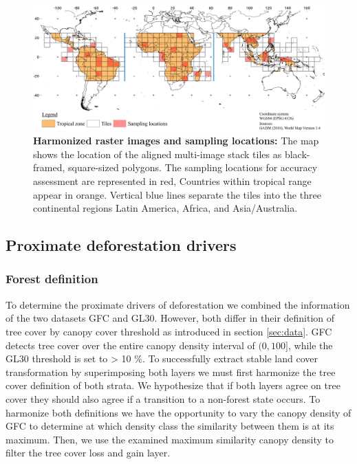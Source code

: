 		\begin{figure}[!ht]
			\centering
			\includegraphics[scale=.96]{img/method_overview_frameless}
			\caption[Harmonized raster images and sampling locations]{\textbf{Harmonized raster images and sampling locations:} The map shows the location of the aligned multi-image stack tiles as black-framed, square-sized polygons. The sampling locations for accuracy assessment are represented in red, Countries within tropical range appear in orange. Vertical blue lines separate the tiles into the three continental regions Latin America, Africa, and Asia/Australia.}
			\label{fig:aligned_tiles}
		\end{figure}

	\subsection{Proximate deforestation drivers} 
		\subsubsection{Forest definition}
		\label{subsubsec:forest_definition}
			To determine the proximate drivers of deforestation we combined the information of the two datasets \ac{GFC} and \ac{GL30}. However, both differ in their definition of tree cover by canopy cover threshold as introduced in section \ref{sec:data}. \ac{GFC} detects tree cover over the entire canopy density interval of $(0,100]$, while the \ac{GL30} threshold is set to > 10 \%. To successfully extract stable land cover transformation by superimposing both layers we must first harmonize the tree cover definition of both strata. We hypothesize that if both layers agree on tree cover they should also agree if a transition to a non-forest state occurs. To harmonize both definitions we have the opportunity to vary the canopy density of \ac{GFC} to determine at which density class the similarity between them is at its maximum. Then, we use the examined maximum similarity canopy density to filter the tree cover loss and gain layer.

